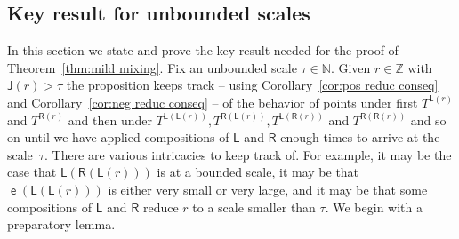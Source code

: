 \documentclass[AHL,Unicode,longabstracts,published]{cedram}
\DeclareMathOperator{\lst}{\mathsf{e}}
\newcommand{\N}{\mathbb{N}}
\newcommand{\Z}{\mathbb{Z}}
\newcommand{\lft}{\mathsf{L}}
\newcommand{\rht}{\mathsf{R}}
\newcommand{\scl}{\mathsf{J}}
\begin{document}
\subsection{Key result for unbounded scales}\label{subsec:reduction main}

In this section we state and prove the key result needed for the proof of Theorem~\ref{thm:mild mixing}. Fix an unbounded scale $\tau \in \N$. Given $r
\in \Z$ with $\scl(r) > \tau$ the proposition keeps track -- using Corollary~\ref{cor:pos reduc conseq} and Corollary~\ref{cor:neg reduc conseq} -- of the behavior of points under first $T^{\lft(r)}$ and $T^{\rht(r)}$ and then under $T^{\lft(\lft(r))}, T^{\rht(\lft(r))}, T^{\lft(\rht(r))}$ and $T^{\rht(\rht(r))}$ and so on until we have applied compositions of $\lft$ and $\rht$ enough times to arrive at the scale~$\tau$. There are various intricacies to keep track of. For example, it may be the case that $\lft(\rht(\lft(r)))$ is at a bounded scale, it may be that $\lst(\lft(\lft(r)))$ is either very small or very large, and it may be that some compositions of $\lft$ and $\rht$ reduce $r$ to a scale smaller than $\tau$. We begin with a preparatory lemma.
\end{document}
